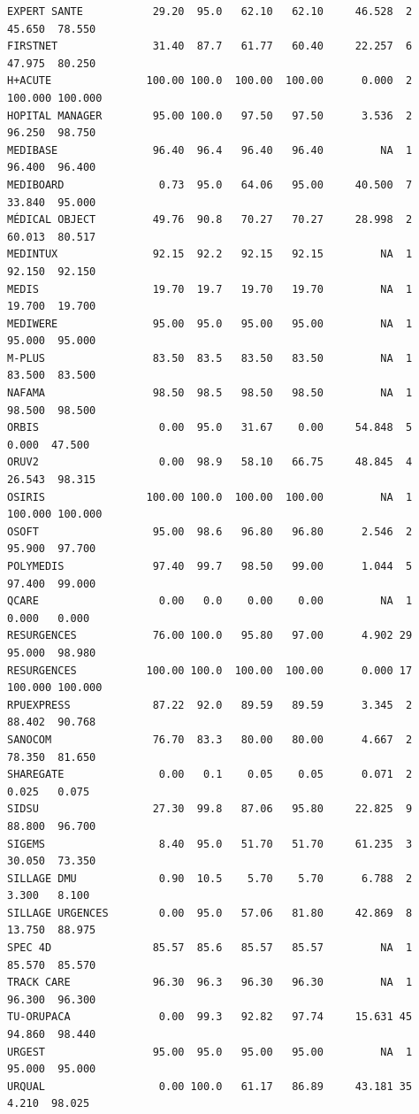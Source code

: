 \documentclass[]{article}
\begin{document}
\begin{verbatim}
EXPERT SANTE           29.20  95.0   62.10   62.10     46.528  2  45.650  78.550
FIRSTNET               31.40  87.7   61.77   60.40     22.257  6  47.975  80.250
H+ACUTE               100.00 100.0  100.00  100.00      0.000  2 100.000 100.000
HOPITAL MANAGER        95.00 100.0   97.50   97.50      3.536  2  96.250  98.750
MEDIBASE               96.40  96.4   96.40   96.40         NA  1  96.400  96.400
MEDIBOARD               0.73  95.0   64.06   95.00     40.500  7  33.840  95.000
MÉDICAL OBJECT         49.76  90.8   70.27   70.27     28.998  2  60.013  80.517
MEDINTUX               92.15  92.2   92.15   92.15         NA  1  92.150  92.150
MEDIS                  19.70  19.7   19.70   19.70         NA  1  19.700  19.700
MEDIWERE               95.00  95.0   95.00   95.00         NA  1  95.000  95.000
M-PLUS                 83.50  83.5   83.50   83.50         NA  1  83.500  83.500
NAFAMA                 98.50  98.5   98.50   98.50         NA  1  98.500  98.500
ORBIS                   0.00  95.0   31.67    0.00     54.848  5   0.000  47.500
ORUV2                   0.00  98.9   58.10   66.75     48.845  4  26.543  98.315
OSIRIS                100.00 100.0  100.00  100.00         NA  1 100.000 100.000
OSOFT                  95.00  98.6   96.80   96.80      2.546  2  95.900  97.700
POLYMEDIS              97.40  99.7   98.50   99.00      1.044  5  97.400  99.000
QCARE                   0.00   0.0    0.00    0.00         NA  1   0.000   0.000
RESURGENCES            76.00 100.0   95.80   97.00      4.902 29  95.000  98.980
RESURGENCES           100.00 100.0  100.00  100.00      0.000 17 100.000 100.000
RPUEXPRESS             87.22  92.0   89.59   89.59      3.345  2  88.402  90.768
SANOCOM                76.70  83.3   80.00   80.00      4.667  2  78.350  81.650
SHAREGATE               0.00   0.1    0.05    0.05      0.071  2   0.025   0.075
SIDSU                  27.30  99.8   87.06   95.80     22.825  9  88.800  96.700
SIGEMS                  8.40  95.0   51.70   51.70     61.235  3  30.050  73.350
SILLAGE DMU             0.90  10.5    5.70    5.70      6.788  2   3.300   8.100
SILLAGE URGENCES        0.00  95.0   57.06   81.80     42.869  8  13.750  88.975
SPEC 4D                85.57  85.6   85.57   85.57         NA  1  85.570  85.570
TRACK CARE             96.30  96.3   96.30   96.30         NA  1  96.300  96.300
TU-ORUPACA              0.00  99.3   92.82   97.74     15.631 45  94.860  98.440
URGEST                 95.00  95.0   95.00   95.00         NA  1  95.000  95.000
URQUAL                  0.00 100.0   61.17   86.89     43.181 35   4.210  98.025
\end{verbatim}
\end{document}
